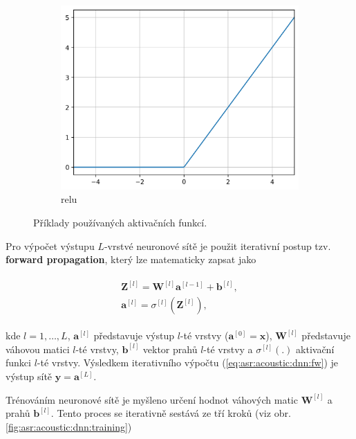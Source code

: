 \begin{figure}[htpb]
\begin{subfigure}[b]{0.28\textwidth}
    \includegraphics[width=\textwidth]{./ch4-asr/img/relu.png}
    \caption{relu}
    \label{fig:asr:acoustic:dnn:activation:relu}
  \end{subfigure}
  \caption{Příklady používaných aktivačních funkcí.}
  \label{fig:asr:acoustic:dnn:activation}
\end{figure}

Pro výpočet výstupu $L$-vrstvé neuronové sítě je použit iterativní postup tzv. \textbf{forward propagation}, který lze matematicky zapsat jako

\begin{align}
  \begin{split}
    \mathbf{Z}^{[l]} = \mathbf{W}^{[l]}\mathbf{a}^{[l-1]} + \mathbf{b}^{[l]}, \\
    \mathbf{a}^{[l]} = \sigma^{[l]}\left(\mathbf{Z}^{[l]}\right),
  \end{split}
  \label{eq:asr:acoustic:dnn:fw}
\end{align}

\noindent kde $l = 1, \dots, L$, $\boldsymbol{a}^{[l]}$ představuje výstup $l$-té vrstvy ($\boldsymbol{a}^{[0]} = \boldsymbol{x}$), $\mathbf{W}^{[l]}$ představuje váhovou matici $l$-té vrstvy, $\mathbf{b}^{[l]}$ vektor prahů $l$-té vrstvy a $\sigma^{[l]}(.)$ aktivační funkci $l$-té vrstvy. Výsledkem iterativního výpočtu (\ref{eq:asr:acoustic:dnn:fw}) je výstup sítě $\boldsymbol{y} = \boldsymbol{a}^{[L]}$.

Trénováním neuronové sítě je myšleno určení hodnot váhových matic $\mathbf{W}^{[l]}$ a prahů $\mathbf{b}^{[l]}$. Tento proces se iterativně sestává ze tří kroků (viz obr. \ref{fig:asr:acoustic:dnn:training})

